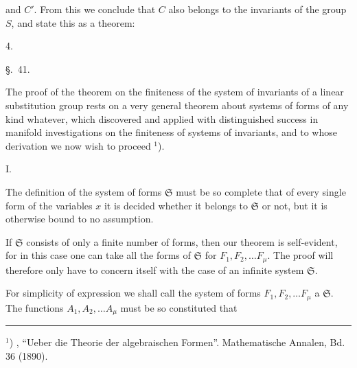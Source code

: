and $C'$. From this we conclude that $C$ also belongs to the invariants
of the group $S$, and state this as a theorem:

4. 

\begin{center}
\S.\ 41.

\end{center}

The proof of the theorem on the finiteness of the system of invariants
 of a linear substitution group rests on a very
general theorem about systems of forms of any kind whatever, which
 discovered and applied with distinguished
success in manifold investigations on the finiteness
of systems of invariants, and to whose derivation we now wish
to proceed $^{1}$).

I. 

The definition of the system of forms $\mathfrak{S}$ must be so complete
that of every single form of the variables $x$ it is decided
whether it belongs to $\mathfrak{S}$ or not, but it is otherwise bound to no
assumption.

If $\mathfrak{S}$ consists of only a finite number of forms, then
our theorem is self-evident, for in this case one can
take all the forms of $\mathfrak{S}$ for $F_1,F_2,\ldots F_\mu$. The
proof will therefore only have to concern itself with the case of an infinite
system $\mathfrak{S}$.

For simplicity of expression we shall call the system of forms
 $F_1,F_2,\ldots F_\mu$ a  $\mathfrak{S}$.
The functions $A_1,A_2,\ldots A_\mu$ must be so constituted that

\bigskip
\noindent\rule{4cm}{0.4pt}

\noindent $^{1}$) , ``Ueber die Theorie der algebraischen Formen''. Mathematische
 Annalen, Bd. 36 (1890).
